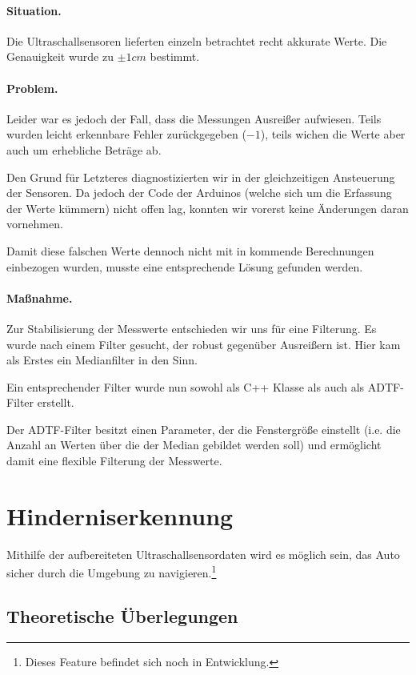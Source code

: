 \documentclass[a4paper,12pt]{report}
\begin{document}
	\paragraph{Situation.}
	Die Ultraschallsensoren lieferten einzeln betrachtet recht akkurate Werte.
	Die Genauigkeit wurde zu $\pm1cm$ bestimmt.

	\paragraph{Problem.}
	Leider war es jedoch der Fall, dass die Messungen Ausreißer aufwiesen.
	Teils wurden leicht erkennbare Fehler zurückgegeben ($-1$), teils wichen die Werte aber auch um erhebliche Beträge ab.

	Den Grund für Letzteres diagnostizierten wir in der gleichzeitigen Ansteuerung der Sensoren.
	Da jedoch der Code der Arduinos (welche sich um die Erfassung der Werte kümmern) nicht offen lag, konnten wir vorerst keine Änderungen daran vornehmen.

	Damit diese falschen Werte dennoch nicht mit in kommende Berechnungen einbezogen wurden, musste eine entsprechende Lösung gefunden werden.

	\paragraph{Maßnahme.}
	Zur Stabilisierung der Messwerte entschieden wir uns für eine Filterung.
	Es wurde nach einem Filter gesucht, der robust gegenüber Ausreißern ist.
	Hier kam als Erstes ein Medianfilter in den Sinn.

	Ein entsprechender Filter wurde nun sowohl als C++ Klasse als auch als ADTF-Filter erstellt.

	Der ADTF-Filter besitzt einen Parameter, der die Fenstergröße einstellt (i.e. die Anzahl an Werten über die der Median gebildet werden soll) und ermöglicht damit eine flexible Filterung der Messwerte.

\section{Hinderniserkennung}
\label{section-ObstacleDetection}

	Mithilfe der aufbereiteten Ultraschallsensordaten wird es möglich sein, das Auto sicher durch die Umgebung zu navigieren.\footnote{Dieses Feature befindet sich noch in Entwicklung.}

\subsection{Theoretische Überlegungen}
\end{document}
